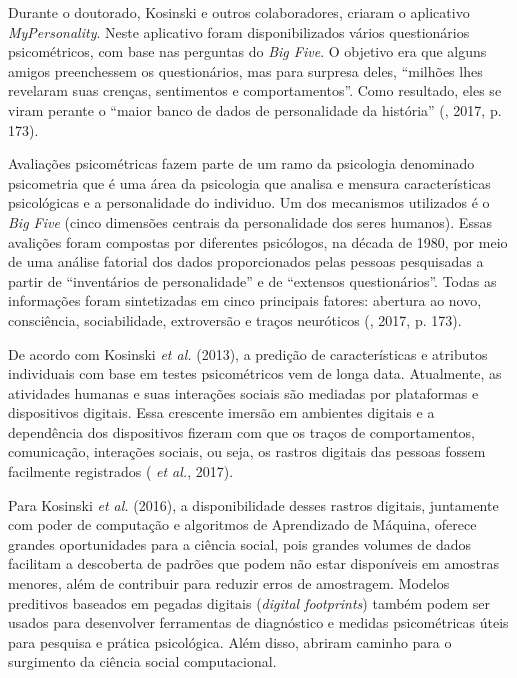 Durante o doutorado, Kosinski e outros colaboradores, criaram o
aplicativo \emph{MyPersonality}. Neste aplicativo foram disponibilizados
vários questionários psicométricos, com base nas perguntas do \emph{Big
Five}. O objetivo era que alguns amigos preenchessem os questionários,
mas para surpresa deles, ``milhões lhes revelaram suas crenças,
sentimentos e comportamentos''. Como resultado, eles se viram perante o
``maior banco de dados de personalidade da história'' (, 2017, p. 173).

Avaliações psicométricas fazem parte de um ramo da psicologia denominado
psicometria que é uma área da psicologia que analisa e mensura
características psicológicas e a personalidade do individuo. Um dos
mecanismos utilizados é o \emph{Big Five} (cinco dimensões centrais da
personalidade dos seres humanos). Essas avalições foram compostas por
diferentes psicólogos, na década de 1980, por meio de uma análise
fatorial dos dados proporcionados pelas pessoas pesquisadas a partir de
``inventários de personalidade'' e de ``extensos questionários''. Todas
as informações foram sintetizadas em cinco principais fatores: abertura
ao novo, consciência, sociabilidade, extroversão e traços neuróticos
(, 2017, p. 173).

De acordo com Kosinski \emph{et al.} (2013), a predição de características e
atributos individuais com base em testes psicométricos vem de longa
data. Atualmente, as atividades humanas e suas interações sociais são
mediadas por plataformas e dispositivos digitais. Essa crescente imersão
em ambientes digitais e a dependência dos dispositivos fizeram com que
os traços de comportamentos, comunicação, interações sociais, ou seja,
os rastros digitais das pessoas fossem facilmente registrados (
\emph{et al.}, 2017).

Para Kosinski \emph{et al.} (2016), a disponibilidade desses rastros digitais,
juntamente com poder de computação e algoritmos de Aprendizado de
Máquina, oferece grandes oportunidades para a ciência social, pois
grandes volumes de dados facilitam a descoberta de padrões que podem não
estar disponíveis em amostras menores, além de contribuir para reduzir
erros de amostragem. Modelos preditivos baseados em pegadas digitais
(\emph{digital footprints}) também podem ser usados para desenvolver
ferramentas de diagnóstico e medidas psicométricas úteis para pesquisa e
prática psicológica. Além disso, abriram caminho para o surgimento da
ciência social computacional.


